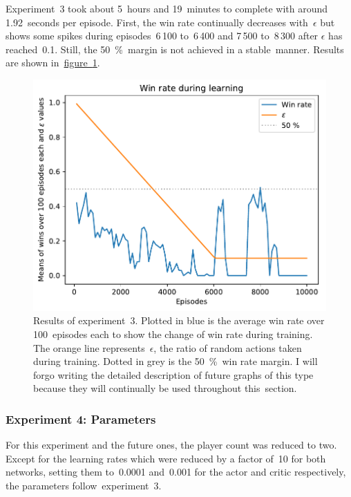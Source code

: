\documentclass[a4paper,titlepage]{article}
\begin{document}
Experiment~3 took about 5~hours and 19~minutes to complete with around 1.92~seconds per episode. First, the win rate continually decreases with~$\epsilon$ but shows some spikes during episodes~6\,100 to~6\,400 and 7\,500 to~8\,300 after $\epsilon$ has reached~0.1. Still, the 50~\%~margin is not achieved in a stable~manner. Results are shown in~\hyperref[fig:exp3]{figure~\ref*{fig:exp3}}.
\begin{figure}[t]
  \centering
  \includegraphics[width=\textwidth]{../experiments/exp3/win_stats.pdf}
  \caption{Results of experiment~3. Plotted in blue is the average win rate over 100~episodes each to show the change of win rate during training. The orange line represents~$\epsilon$, the ratio of random actions taken during training. Dotted in grey is the 50~\%~win rate margin. I will forgo writing the detailed description of future graphs of this type because they will continually be used throughout this~section.}
  \label{fig:exp3}
\end{figure}

\subsubsection*{Experiment 4: Parameters}

For this experiment and the future ones, the player count was reduced to two. Except for the learning rates which were reduced by a factor of~10 for both networks, setting them to~0.0001 and~0.001 for the actor and critic respectively, the parameters follow~experiment~3.
\end{document}
